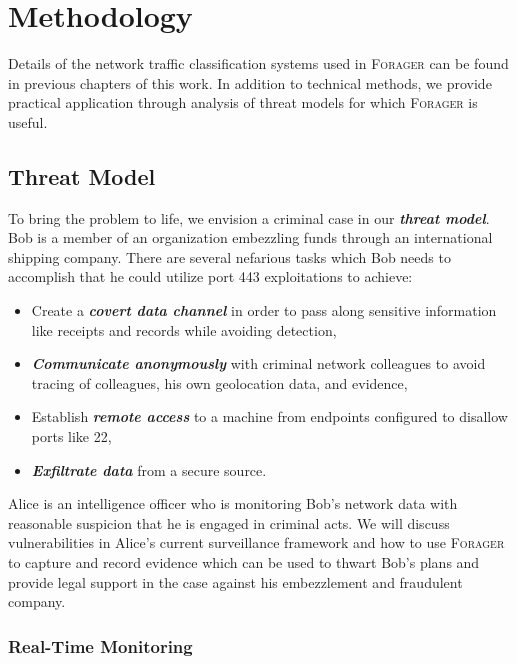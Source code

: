 \section{Methodology}
Details of the network traffic classification systems used in \textsc{Forager} can be found in previous chapters of this work. In addition to technical methods, we provide practical application through analysis of threat models for which \textsc{Forager} is useful.

\subsection{Threat Model}
To bring the problem to life, we envision a criminal case in our \textit{\textbf{threat model}}. Bob is a member of an organization embezzling funds through an international shipping company. There are several nefarious tasks which Bob needs to accomplish that he could utilize port 443 exploitations to achieve:
\begin{itemize}
\item Create a \textbf{\textit{covert data channel}} in order to pass along sensitive information like receipts and records while avoiding detection,
\item \textbf{\textit{Communicate anonymously}} with criminal network colleagues to avoid tracing of colleagues, his own geolocation data, and evidence,
\item Establish \textbf{\textit{remote access}} to a machine from endpoints configured to disallow ports like 22,
\item \textbf{\textit{Exfiltrate data}} from a secure source.
\end{itemize}

Alice is an intelligence officer who is monitoring Bob's network data with reasonable suspicion that he is engaged in criminal acts. We will discuss vulnerabilities in Alice's current surveillance framework and how to use \textsc{Forager} to capture and record evidence which can be used to thwart Bob's plans and provide legal support in the case against his embezzlement and fraudulent company.

\subsubsection{Real-Time Monitoring}

